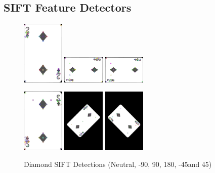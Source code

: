 \documentclass[conference]{IEEEtran}
\begin{document}
\subsection{SIFT Feature Detectors}
\begin{figure}[H]
    \centerline{
        {\includegraphics[width=20mm, scale=0.5]{./figures/SIFT/diamondNeutral SIFT.png}}
        {\includegraphics[width=20mm, scale=0.5]{./figures/SIFT/diamondDeg 90 SIFT.png}}
        {\includegraphics[width=20mm, scale=0.5]{./figures/SIFT/diamondDeg -90 SIFT.png}}
    }
    \centerline{
        {\includegraphics[width=20mm, scale=0.5]{./figures/SIFT/diamond180 Deg SIFT.png}}
        {\includegraphics[width=20mm, scale=0.5]{./figures/SIFT/diamondDeg -45 SIFT.png}}
        {\includegraphics[width=20mm, scale=0.5]{./figures/SIFT/diamondDeg 45 SIFT.png}}
    }
    \caption{Diamond SIFT Detections (Neutral, -90\degree, 90\degree, 180\degree, -45\degree and 45\degree)}
    \label{fig}
\end{figure}
\end{document}
